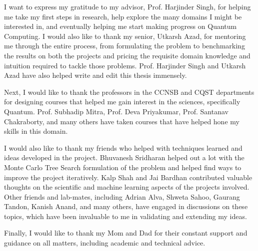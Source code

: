 I want to express my gratitude to my advisor, Prof. Harjinder Singh, for helping me take my first steps in research, help explore the many domains I might be interested in, and eventually helping me start making progress on Quantum Computing. I would also like to thank my senior, Utkarsh Azad, for mentoring me through the entire process, from formulating the problem to benchmarking the results on both the projects and pricing the requisite domain knowledge and intuition required to tackle those problems. Prof. Harjinder Singh and Utkarsh Azad have also helped write and edit this thesis immensely.

Next, I would like to thank the professors in the CCNSB and CQST departments for designing courses that helped me gain interest in the sciences, specifically Quantum. Prof. Subhadip Mitra, Prof. Deva Priyakumar, Prof. Santanav Chakraborty, and many others have taken courses that have helped hone my skills in this domain.

I would also like to thank my friends who helped with techniques learned and ideas developed in the project. Bhuvanesh Sridharan helped out a lot with the Monte Carlo Tree Search formulation of the problem and helped find ways to improve the project iteratively. Kalp Shah and Jai Bardhan contributed valuable thoughts on the scientific and machine learning aspects of the projects involved. Other friends and lab-mates, including Adrian Alva, Shweta Sahoo, Gaurang Tandon, Kanish Anand, and many others, have engaged in discussions on these topics, which have been invaluable to me in validating and extending my ideas.

Finally, I would like to thank my Mom and Dad for their constant support and guidance on all matters, including academic and technical advice. 
